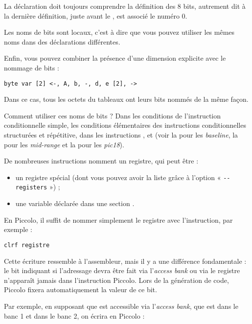 La déclaration doit toujours comprendre la définition des 8 bits, autrement dit à la dernière définition, juste avant le \piccolo{>}, est associé le numéro 0.

Les noms de bits sont locaux, c'est à dire que vous pouvez utiliser les mêmes noms dans des déclarations  différentes.

Enfin, vous pouvez combiner la présence d'une dimension explicite avec le nommage de bits :

\begin{lstlisting}[language=piccolo]
byte var [2] <-, A, b, -, d, e [2], ->
\end{lstlisting}

Dans ce cas, tous les octets du tableaux ont leurs bits nommés de la même façon.

Comment utiliser ces noms de bits ? Dans les conditions de l'instruction conditionnelle simple, les conditions élémentaires des instructions conditionnelles structurées et répétitive, dans les instructions ,  et  (voir la  pour les \emph{baseline}, la  pour les \emph{mid-range} et la  pour les \emph{pic18}). 



De nombreuses instructions nomment un registre, qui peut être :
\begin{itemize}
  \item un registre spécial (dont vous pouvez avoir la liste grâce à l'option « \texttt{-{}-registers} ») ;
  \item une variable déclarée dans une section .
\end{itemize}

En Piccolo, il suffit de nommer simplement le registre avec l'instruction, par exemple :
\begin{lstlisting}[language=piccolo]
clrf registre
\end{lstlisting}

Cette écriture ressemble à l'assembleur, mais il y a une différence fondamentale : le bit indiquant si l'adressage devra être fait via l'\emph{access bank} ou via le registre  n'apparaît jamais dans l'instruction Piccolo. Lors de la génération de code, Piccolo fixera automatiquement la valeur de ce bit.

Par exemple, en supposant que  est accessible via l'\emph{access bank}, que  est dans le banc 1 et  dans le banc 2, on écrira en Piccolo :

